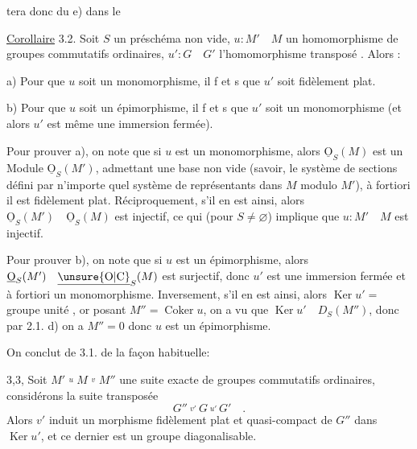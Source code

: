 tera donc du e) dans le

\uline{Corollaire} 3.2. Soit $S$ un préschéma non vide, $u:M'\quad M$ un homomorphisme de groupes commutatifs ordinaires, $u':G\quad G'$ l'homomorphisme transposé . Alors :

a) Pour que $u$ soit un monomorphisme, il f et s que $u'$ soit fidèlement plat.

b) Pour que $u$ soit un épimorphisme, il f et s que $u'$ soit un monomorphisme (et alors $u'$ est même une immersion fermée).

Pour prouver a), on note que si $u$ est un monomorphisme, alors
$\underline{\mathrm O}_S(M)$ est un Module   $\underline{\mathrm O}_S(M')$, 
admettant une base non vide (savoir, le système de sections défini par
n'importe quel système de représentants dans $M$ modulo $M'$), à fortiori
il est fidèlement plat. Réciproquement, s'il en est ainsi, alors $\underline{\mathrm O}_S(M')\quad
\underline{\mathrm O}_S(M)$ est injectif, ce qui (pour $S\ne\varnothing$) implique que $u:M'\quad M$ est
injectif.

Pour prouver b), on note que si $u$ est un épimorphisme, alors
$\underline{\mathrm O}_S(M')\quad\underline{\unsure{\mathrm O|\mathrm C}}_S(M)$ est surjectif, donc $u'$ est une immersion fermée et à
fortiori un monomorphisme. Inversement, s'il en est ainsi, alors $\operatorname{Ker} u'={}$ groupe unité , or  posant $M''=\operatorname{Coker}u$, on a vu que
$\operatorname{Ker}u'\quad D_S(M'')$, donc par 2.1. d) on a $M''=0$ donc $u$ est un épimorphisme.

On conclut de 3.1. de la façon habituelle:

\uline{} 3,3, Soit $M'\overset{u}{\quad} M\overset{v}{\quad} M''$ une suite exacte de groupes
commutatifs ordinaires, considérons la suite transposée
\[
G''\overset{v'}{\quad} G\overset{u'}{\quad}G'\quad .
\]
Alors $v'$ induit un morphisme fidèlement plat et quasi-compact de $G''$
dans $\operatorname{Ker}u'$, et ce dernier est un groupe diagonalisable.
